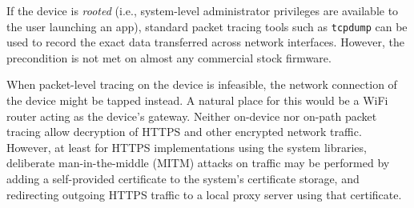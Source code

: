 
If the device is \textit{rooted} (i.e., system-level administrator 
privileges are available to the user launching an app), standard 
packet tracing tools such as \texttt{tcpdump} can be used to 
record the exact data transferred across network interfaces. 
However, the precondition is not met on almost any commercial stock 
firmware.

When packet-level tracing on the device is infeasible, the network 
connection of the device might be tapped instead. A natural place 
for this would be a WiFi router acting as the device's gateway. 
Neither on-device nor on-path packet tracing allow decryption of 
HTTPS and other encrypted network traffic. However, at least for 
HTTPS implementations using the system libraries, deliberate 
man-in-the-middle (MITM) attacks on traffic may be performed 
by adding a self-provided certificate to the system's certificate 
storage, and redirecting outgoing HTTPS traffic to a local proxy 
server using that certificate.
